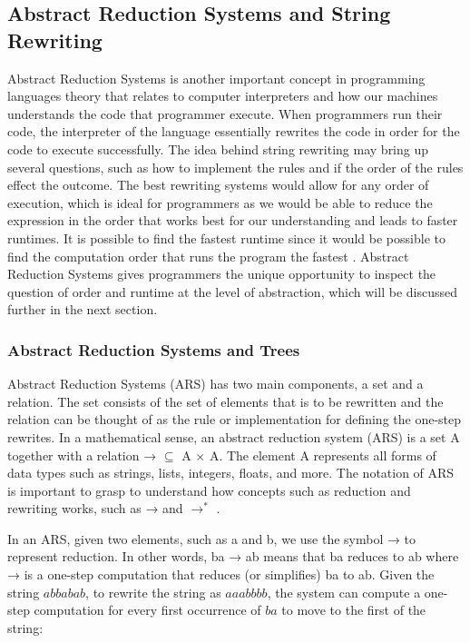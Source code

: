 \documentclass{article}
\begin{document}
\subsection{Abstract Reduction Systems and String Rewriting}

Abstract Reduction Systems is another important concept in programming languages theory that relates to computer interpreters and how our machines understands the code that programmer execute. When programmers run their code, the interpreter of the language essentially rewrites the code in order for the code to execute successfully. The idea behind string rewriting may bring up several questions, such as how to implement the rules and if the order of the rules effect the outcome. The best rewriting systems would allow for any order of execution, which is ideal for programmers as we would be able to reduce the expression in the order that works best for our understanding and leads to faster runtimes. It is possible to find the fastest runtime since it would be possible to find the computation order that runs the program the fastest \cite{PL}. Abstract Reduction Systems gives programmers the unique opportunity to inspect the question of order and runtime at the level of abstraction, which will be discussed further in the next section.

\subsubsection{Abstract Reduction Systems and Trees}

Abstract Reduction Systems (ARS) has two main components, a set and a relation. The set consists of the set of elements that is to be rewritten and the relation can be thought of as the rule or implementation for defining the one-step rewrites. In a mathematical sense, an abstract reduction system (ARS) is a set A together with a relation → $\subseteq$ A × A. The element A represents all forms of data types such as strings, lists, integers, floats, and more. The notation of ARS is important to grasp to understand how concepts such as reduction and rewriting works, such as → and $\rightarrow^*$ \cite{PL}.

\medskip\noindent
In an ARS, given two elements, such as a and b, we use the symbol → to represent reduction. In other words,  ba → ab means that ba reduces to ab where → is a one-step computation that reduces (or simplifies) ba to ab. Given the string $abbabab$, to rewrite the string as $aaabbbb$, the system can compute a one-step computation for every first occurrence of $ba$ to move to the first of the string:
\end{document}
